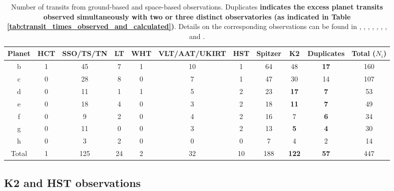 \documentclass[twocolumn]{aastex63}
\begin{document}
\begin{table}
    \centering
    \begin{tabular}{c c c c c c c c c c c}
        \hline
        Planet & HCT & SSO/TS/TN & LT & WHT & VLT/AAT/UKIRT & HST & Spitzer & K2  & Duplicates & Total ($N_i$)\\
        \hline
        b      & 1   & 45    & 7   & 1   & 10       & 1   & 64      & 48   & \textbf{17}        & 160   \\
        c      & 0   & 28    & 8   & 0   & 7        & 1   & 47      & 30   & 14        & 107   \\
        d      & 0   & 11    & 1   & 1   & 5        & 2   & 23      & \textbf{17}   & \textbf{7}         & 53    \\
        e      & 0   & 18    & 4   & 0   & 3        & 2   & 18      & \textbf{11}   & \textbf{7}         & 49    \\
        f      & 0   & 9     & 2   & 0   & 4        & 2   & 16      & 7    & \textbf{6}         & 34    \\
        g      & 0   & 11    & 0   & 0   & 3        & 2   & 13      & \textbf{5}    & \textbf{4}         & 30    \\
        h      & 0   & 3     & 2   & 0   & 0        & 0   & 7       & 4    & 2         & 14    \\
        \hline
        Total  & 1   & 125   & 24  & 2   & 32       & 10  & 188     & \textbf{122}  & \textbf{57}        & 447   \\
        \hline
    \end{tabular}
    \caption{Number of transits from ground-based and space-based observations. Duplicates \textbf{indicates the excess planet transits observed simultaneously with two or three distinct observatories (as indicated in Table \ref{tab:transit_times_observed_and_calculated})}. Details on the corresponding observations can be found in \citet{Gillon2016}, \citet{Gillon2017}, \citet{Grimm2018}, \citet{deWit2016,deWit2018}, \citet{Delrez2018a}, \citet{Ducrot2018}, \citet{Burdanov2019}, and \citet{Ducrot2020}.}
    \label{tab:transit_time_list}
\end{table}

\subsection{K2 and HST observations}

\end{document}
